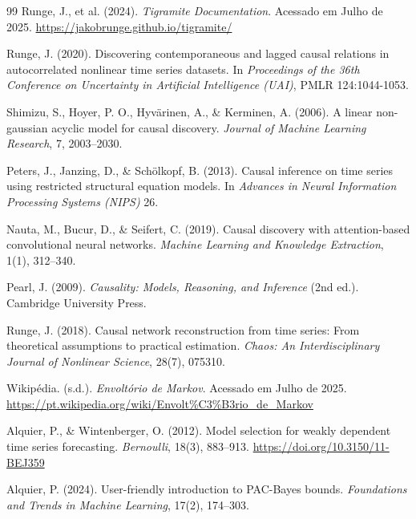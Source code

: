 \documentclass[12pt, a4paper]{article}
\begin{document}
\begin{thebibliography}{99}
Runge, J., et al. (2024). \textit{Tigramite Documentation}. Acessado em Julho de 2025. \url{https://jakobrunge.github.io/tigramite/}

Runge, J. (2020). Discovering contemporaneous and lagged causal relations in autocorrelated nonlinear time series datasets. In \textit{Proceedings of the 36th Conference on Uncertainty in Artificial Intelligence (UAI)}, PMLR 124:1044-1053.

Shimizu, S., Hoyer, P. O., Hyvärinen, A., \& Kerminen, A. (2006). A linear non-gaussian acyclic model for causal discovery. \textit{Journal of Machine Learning Research}, 7, 2003--2030.

Peters, J., Janzing, D., \& Schölkopf, B. (2013). Causal inference on time series using restricted structural equation models. In \textit{Advances in Neural Information Processing Systems (NIPS)} 26.


Nauta, M., Bucur, D., \& Seifert, C. (2019). Causal discovery with attention-based convolutional neural networks. \textit{Machine Learning and Knowledge Extraction}, 1(1), 312--340.



Pearl, J. (2009).
\textit{Causality: Models, Reasoning, and Inference} (2nd ed.).
Cambridge University Press.

Runge, J. (2018).
Causal network reconstruction from time series: From theoretical assumptions to practical estimation.
\textit{Chaos: An Interdisciplinary Journal of Nonlinear Science}, 28(7), 075310.

Wikipédia. (s.d.).
\textit{Envoltório de Markov}.
Acessado em Julho de 2025.
\url{https://pt.wikipedia.org/wiki/Envolt\%C3\%B3rio_de_Markov}


Alquier, P., \& Wintenberger, O. (2012).
Model selection for weakly dependent time series forecasting.
\textit{Bernoulli}, 18(3), 883--913. \url{https://doi.org/10.3150/11-BEJ359}


Alquier, P. (2024).
User-friendly introduction to PAC-Bayes bounds.
\textit{Foundations and Trends in Machine Learning}, 17(2), 174--303.


\end{thebibliography}
\end{document}
